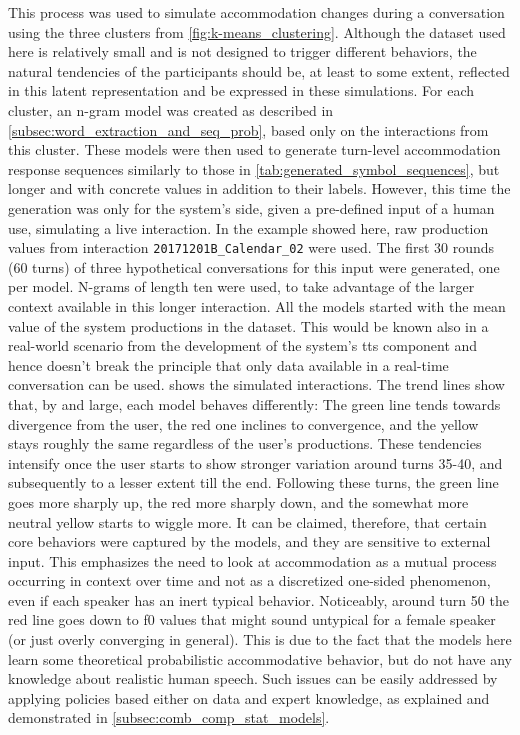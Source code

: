 This process was used to simulate accommodation changes during a conversation using the three clusters from \cref{fig:k-means_clustering}.
Although the dataset used here is relatively small and is not designed to trigger different behaviors, the natural tendencies of the participants should be, at least to some extent, reflected in this latent representation and be expressed in these simulations.
For each cluster, an n-gram model was created as described in \cref{subsec:word_extraction_and_seq_prob}, based only on the interactions from this cluster.
These models were then used to generate turn-level accommodation response sequences similarly to those in \cref{tab:generated_symbol_sequences}, but longer and with concrete values in addition to their labels.
However, this time the generation was only for the system's side, given a pre-defined input of a human use, simulating a live interaction.
In the example showed here, raw production values from interaction \texttt{20171201B\_Calendar\_02} were used.
The first 30 rounds (60 turns) of three hypothetical conversations for this input were generated, one per model.
N-grams of length ten were used, to take advantage of the larger context available in this longer interaction.
All the models started with the mean value of the system productions in the dataset.
This would be known also in a real-world scenario from the development of the system's \ac{tts} component and hence doesn't break the principle that only data available in a real-time conversation can be used.
 shows the simulated interactions.
The trend lines show that, by and large, each model behaves differently:
The green line tends towards divergence from the user, the red one inclines to convergence, and the yellow stays roughly the same regardless of the user's productions.
These tendencies intensify once the user starts to show stronger variation around turns 35-40, and subsequently to a lesser extent till the end.
Following these turns, the green line goes more sharply up, the red more sharply down, and the somewhat more neutral yellow starts to wiggle more.
It can be claimed, therefore, that certain core behaviors were captured by the models, and they are sensitive to external input.
This emphasizes the need to look at accommodation as a mutual process occurring in context over time and not as a discretized one-sided phenomenon, even if each speaker has an inert typical behavior.
Noticeably, around turn 50 the red line goes down to \ac{f0} values that might sound untypical for a female speaker (or just overly converging in general).
This is due to the fact that the models here learn some theoretical probabilistic accommodative behavior, but do not have any knowledge about realistic human speech.
Such issues can be easily addressed by applying policies based either on data and expert knowledge, as explained and demonstrated in \cref{subsec:comb_comp_stat_models}.